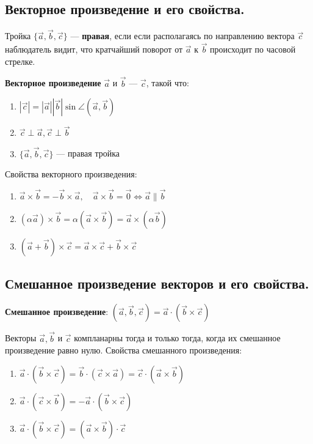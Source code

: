 \subsection{Векторное произведение и его свойства.}
\begin{definition}
    Тройка $\{\vec a, \vec b, \vec c\}$ --- \textbf{правая}, если если располагаясь по направлению вектора $\vec c$ наблюдатель видит, что кратчайший поворот от $\vec a$ к
    $\vec b$ происходит по часовой стрелке.
\end{definition}
\begin{definition}
    \textbf{Векторное произведение} $\vec a$ и $\vec b$ --- $\vec c$, такой что:
    \begin{enumerate}
        \item $|\vec c|=|\vec a||\vec b|\sin\angle(\vec a, \vec b)$
        \item $\vec c\perp \vec a, \vec c\perp \vec b$
        \item $\{\vec a, \vec b, \vec c\}$ --- правая тройка
    \end{enumerate}
\end{definition}
Свойства векторного произведения:
\begin{enumerate}
    \item $\vec a\times \vec b=-\vec b\times \vec a, \quad \vec a\times \vec b=\vec 0 \Leftrightarrow \vec a\parallel\vec b$
    \item $(\alpha\vec a)\times \vec b=\alpha(\vec a\times \vec b)=\vec a\times (\alpha\vec b)$
    \item $(\vec a + \vec b)\times \vec c=\vec a\times \vec c+\vec b\times \vec c$
\end{enumerate}

\subsection{Смешанное произведение векторов и его свойства.}
\begin{definition}
    \textbf{Смешанное произведение}: $(\vec a, \vec b, \vec c)=\vec a \cdot (\vec b \times \vec c)$
\end{definition}
Векторы $\vec a, \vec b$ и $\vec c$ компланарны тогда и только тогда, когда их смешанное произведение равно нулю.
Свойства смешанного произведения:
\begin{enumerate}
    \item $\vec a\cdot (\vec b \times \vec c)=\vec b\cdot (\vec c \times \vec a)=\vec c\cdot (\vec a \times \vec b)$
    \item $\vec a\cdot (\vec c \times \vec b)=-\vec a\cdot (\vec b \times \vec c)$
    \item $\vec a\cdot (\vec b \times \vec c)=(\vec a \times \vec b)\cdot \vec c$
\end{enumerate}

